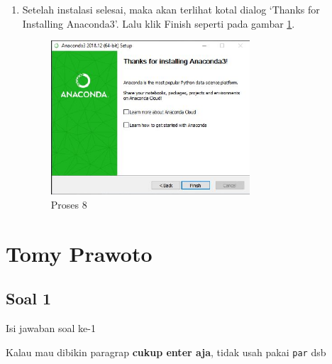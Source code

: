 \begin{itemize}
\begin{enumerate}
\item Setelah instalasi selesai, maka akan terlihat kotal dialog `Thanks for Installing Anaconda3'. Lalu klik Finish seperti pada gambar \ref{gambar8}.
\begin{figure}[ht]
	\centerline{\includegraphics[width=0.70\textwidth]{figures/1/1144124/h.JPG}}
	\caption{Proses 8}
	\label{gambar8}
\end{figure}
	    \end{enumerate}
\end{itemize}

\section{Tomy Prawoto}
\subsection{Soal 1}
Isi jawaban soal ke-1

Kalau mau dibikin paragrap \textbf{cukup enter aja}, tidak usah pakai \verb|par| dsb


